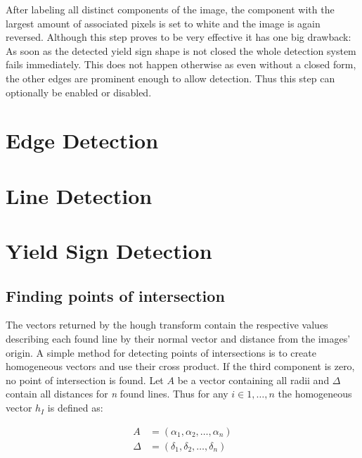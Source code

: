 \documentclass{report}
\begin{document}
After labeling all distinct components of the image, the component
with the largest amount of associated pixels is set to white and the
image is again reversed. Although this step proves to be very
effective it has one big drawback: As soon as the detected yield sign
shape is not closed the whole detection system fails immediately. This
does not happen otherwise as even without a closed form, the other
edges are prominent enough to allow detection. Thus this step can
optionally be enabled or disabled.

{\color{red}{Picture examples}}


\section{Edge Detection}
{\color{red}{To be written: Either Dilation + XOR or Sobel for Fast Hough}}


\section{Line Detection}
{\color{red}{To be written: Either Hough or Fast Hough}}


\section{Yield Sign Detection}
{\color{red}{To be written}}


\subsection{Finding points of intersection}

The vectors returned by the hough transform contain the respective
values describing each found line by their normal vector and distance
from the images' origin. A simple method for detecting points of
intersections is to create homogeneous vectors and use their cross
product. If the third component is zero, no point of intersection is
found. Let \( A \) be a vector containing all radii and \( \Delta \)
contain all distances for \textit{n} found lines. Thus for any \( i
\in 1, \dots, n \) the homogeneous vector \( h_I \) is defined as:

\begin{equation}
  \begin{split}
    A & = (\alpha_1, \alpha_2, \dots, \alpha_n) \\
    \Delta & = (\delta_1, \delta_2, \dots, \delta_n)
  \end{split}
\end{equation}
\end{document}
